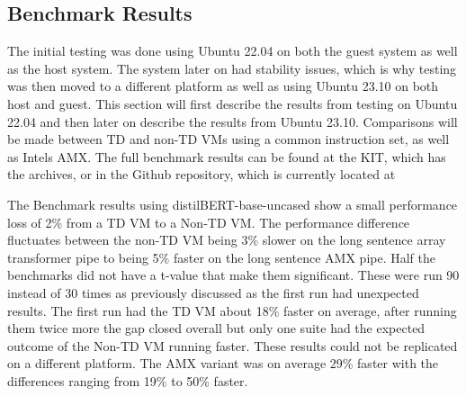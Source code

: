 \subsection{Benchmark Results}
The initial testing was done using Ubuntu 22.04 on both the guest system as well as the host system. The system later on had stability issues, which is why testing was then moved to a different platform as well as using Ubuntu 23.10 on both host and guest. This section will first describe the results from testing on Ubuntu 22.04 and then later on describe the results from Ubuntu 23.10. Comparisons will be made between TD and non-TD VMs using a common instruction set, as well as Intels AMX. The full benchmark results can be found at the KIT, which has the archives, or in the Github repository, which is currently located at


The Benchmark results using distilBERT-base-uncased show a small performance loss of 2\% from a TD VM to a Non-TD VM. The performance difference fluctuates between the non-TD VM being 3\% slower on the long sentence array transformer pipe to being 5\% faster on the long sentence AMX pipe. Half the benchmarks did not have a t-value that make them significant. These were run 90 instead of 30 times as previously discussed as the first run had unexpected results. The first run had the TD VM about 18\% faster on average, after running them twice more the gap closed overall but only one suite had the expected outcome of the Non-TD VM running faster. These results could not be replicated on a different platform. The AMX variant was on average 29\% faster with the differences ranging from 19\% to 50\% faster.

